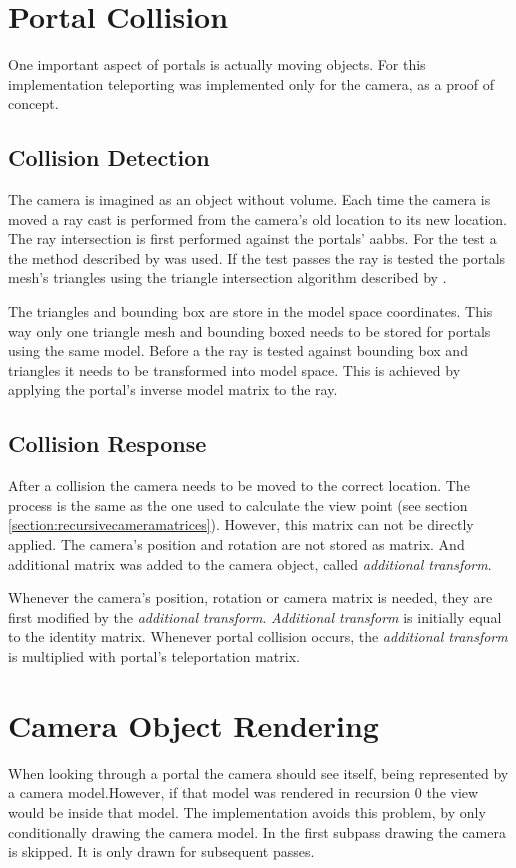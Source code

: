 \section{Portal Collision}
One important aspect of portals is actually moving objects. For this implementation teleporting was implemented only for the camera, as a proof of concept.

\subsection{Collision Detection}
The camera is imagined as an object without volume. Each time the camera is moved a ray cast is performed from the camera's old location to its new location. The ray intersection is first performed against the portals' \glspl{aabb}. For the test a the method described by \textcite{williams:2005:efficient} was used. If the test passes the ray is tested the portals mesh's triangles using the triangle intersection algorithm described by \textcite{moller:2005:fast}.


The triangles and bounding box are store in the model space coordinates. This way only one triangle mesh and bounding boxed needs to be stored for portals using the same model. Before a the ray is tested against bounding box and triangles it needs to be transformed into model space. This is achieved by applying the portal's inverse model matrix to the ray.

\subsection{Collision Response}

After a collision the camera needs to be moved to the correct location. The process is the same as the one used to calculate the view point (see section \ref{section:recursivecameramatrices}). However, this matrix can not be directly applied. The camera's position and rotation are not stored as matrix. And additional matrix was added to the camera object, called \textit{additional transform}.

Whenever the camera's position, rotation or camera matrix is needed, they are first modified by the \textit{additional transform}. \textit{Additional transform} is initially equal to the identity matrix. Whenever portal collision occurs, the \textit{additional transform} is multiplied with portal's teleportation matrix.



\section{Camera Object Rendering}
When looking through a portal the camera should see itself, being represented by a camera model.However, if that model was rendered in recursion 0 the view would be inside that model. The implementation avoids this problem, by only conditionally drawing the camera model. In the first subpass drawing the camera is skipped. It is only drawn for subsequent passes.




